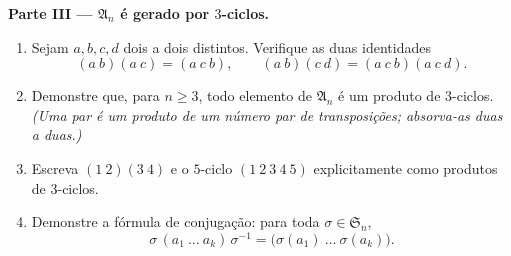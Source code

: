\begin{problem}
\medskip
\noindent\textbf{Parte III --- $\mathfrak A_n$ é gerado por
$3$-ciclos.}
\begin{enumerate}
  \item Sejam $a, b, c, d$ dois a dois distintos. Verifique as duas
        identidades
        \[
        (a\ b)(a\ c) = (a\ c\ b),
        \qquad
        (a\ b)(c\ d) = (a\ c\ b)(a\ c\ d) .
        \]
  \item Demonstre que, para $n \geq 3$, todo elemento de $\mathfrak
        A_n$ é um produto de $3$-ciclos. \emph{(Uma
         par é um produto de um número par de
        transposições; absorva-as duas a duas.)}
  \item Escreva $(1\ 2)(3\ 4)$ e o $5$-ciclo $(1\ 2\ 3\ 4\ 5)$
        explicitamente como produtos de $3$-ciclos.
  \item Demonstre a fórmula de conjugação: para toda $\sigma \in
        \mathfrak S_n$,
        \[
        \sigma\,(a_1\ \dots\ a_k)\,\sigma^{-1}
        = \bigl(\sigma(a_1)\ \dots\ \sigma(a_k)\bigr) .
        \]
\end{enumerate}


\end{problem}
